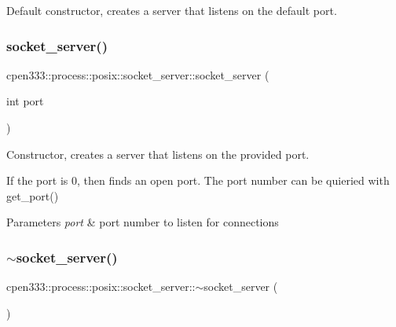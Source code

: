 Default constructor, creates a server that listens on the default port. 

\mbox{\label{classcpen333_1_1process_1_1posix_1_1socket__server_a105715f9f86df458e790db89135a7aac}} 
\subsubsection{\texorpdfstring{socket\+\_\+server()}{socket\_server()}\hspace{0.1cm}{\footnotesize\ttfamily [2/2]}}
{\footnotesize\ttfamily cpen333\+::process\+::posix\+::socket\+\_\+server\+::socket\+\_\+server (\begin{DoxyParamCaption}\item[{int}]{port }\end{DoxyParamCaption})\hspace{0.3cm}{\ttfamily [inline]}}



Constructor, creates a server that listens on the provided port. 

If the port is 0, then finds an open port. The port number can be quieried with get\+\_\+port()


\begin{DoxyParams}{Parameters}
{\em port} & port number to listen for connections \\
\hline
\end{DoxyParams}
\mbox{\label{classcpen333_1_1process_1_1posix_1_1socket__server_a2d07def5c83de193cc2f19c51be31c17}} 
\subsubsection{\texorpdfstring{$\sim$socket\+\_\+server()}{~socket\_server()}}
{\footnotesize\ttfamily cpen333\+::process\+::posix\+::socket\+\_\+server\+::$\sim$socket\+\_\+server (\begin{DoxyParamCaption}{ }\end{DoxyParamCaption})\hspace{0.3cm}{\ttfamily [inline]}}



